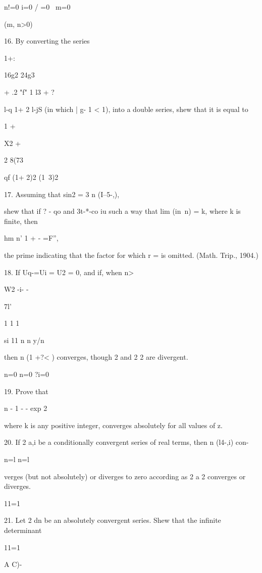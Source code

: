 n!=0 i=0 / =0 \ m=0

(m, n>0)


16. By converting the series

1+:

16g2 24g3

+ .2 "f" 1 l3 +    ?

l-q 1+ 2 l-jS (in which | g- 1 < 1), into a double series, shew that
it is equal to

1 +

X2 +

2 8(73

  qf (1+ 2)2 (1\ 3)2


%
%

17. Assuming that sin2 = 3 n (I--5-,),

shew that if ? - qo and 3t-*-co iu such a way that lim (in\ n) = k,
where k is finite, then

hm n' 1 + - =F'',

the prime indicating that the factor for which r = is omitted. (Math.
Trip., 1904.)

18. If Uq-=Ui = U2 = 0, and if, when n>\,

W2 -i- -

 7l'

1 1 1

si 11 n n y/n

then n (1 +?< ) converges, though 2 and 2 2 are divergent.

n=0 n=0 ?i=0


19. Prove that

n - 1 - - exp 2

where k is any positive integer, converges absolutely for all values
of z.

20. If 2 a,i be a conditionally convergent series of real terms, then
n (l4-,i) con-

n=l n=l

verges (but not absolutely) or diverges to zero according as 2 a 2
converges or diverges.

11=1


21. Let 2 dn be an absolutely convergent series. Shew that the
infinite determinant

11=1

A C)-

